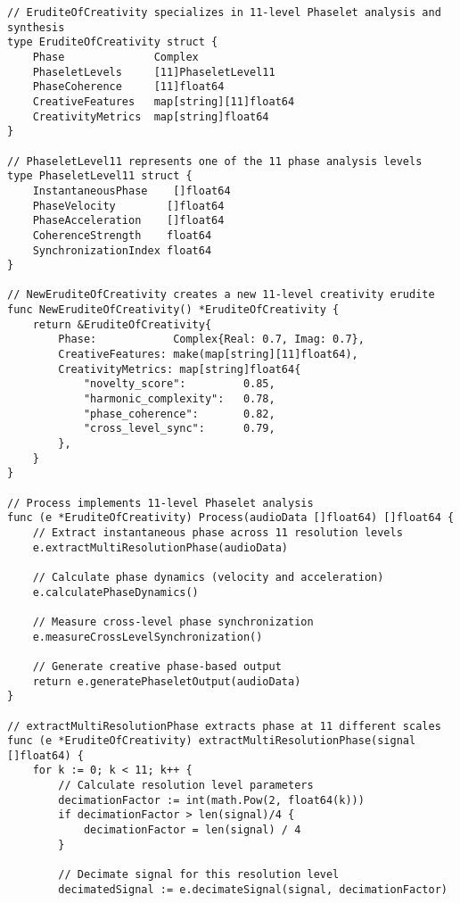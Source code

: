 \begin{tcolorbox}[colback=CodeBackground, colframe=DarkGray, title=Erudite of Creativity Implementation, fonttitle=\bfseries]
\begin{verbatim}
// EruditeOfCreativity specializes in 11-level Phaselet analysis and synthesis
type EruditeOfCreativity struct {
    Phase              Complex
    PhaseletLevels     [11]PhaseletLevel11
    PhaseCoherence     [11]float64
    CreativeFeatures   map[string][11]float64
    CreativityMetrics  map[string]float64
}

// PhaseletLevel11 represents one of the 11 phase analysis levels
type PhaseletLevel11 struct {
    InstantaneousPhase    []float64
    PhaseVelocity        []float64
    PhaseAcceleration    []float64
    CoherenceStrength    float64
    SynchronizationIndex float64
}

// NewEruditeOfCreativity creates a new 11-level creativity erudite
func NewEruditeOfCreativity() *EruditeOfCreativity {
    return &EruditeOfCreativity{
        Phase:            Complex{Real: 0.7, Imag: 0.7},
        CreativeFeatures: make(map[string][11]float64),
        CreativityMetrics: map[string]float64{
            "novelty_score":         0.85,
            "harmonic_complexity":   0.78,
            "phase_coherence":       0.82,
            "cross_level_sync":      0.79,
        },
    }
}

// Process implements 11-level Phaselet analysis
func (e *EruditeOfCreativity) Process(audioData []float64) []float64 {
    // Extract instantaneous phase across 11 resolution levels
    e.extractMultiResolutionPhase(audioData)
    
    // Calculate phase dynamics (velocity and acceleration)
    e.calculatePhaseDynamics()
    
    // Measure cross-level phase synchronization
    e.measureCrossLevelSynchronization()
    
    // Generate creative phase-based output
    return e.generatePhaseletOutput(audioData)
}

// extractMultiResolutionPhase extracts phase at 11 different scales
func (e *EruditeOfCreativity) extractMultiResolutionPhase(signal []float64) {
    for k := 0; k < 11; k++ {
        // Calculate resolution level parameters
        decimationFactor := int(math.Pow(2, float64(k)))
        if decimationFactor > len(signal)/4 {
            decimationFactor = len(signal) / 4
        }
        
        // Decimate signal for this resolution level
        decimatedSignal := e.decimateSignal(signal, decimationFactor)
        

\end{verbatim}
\end{tcolorbox}
